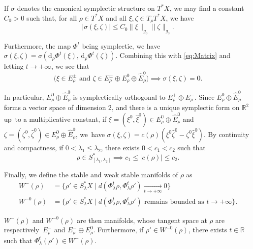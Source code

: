 \documentclass[10pt]{amsart}
\let\sep\mid
\newcommand{\sd}{\mathrm{d}}
\newcommand{\rd}{\,\mathrm{d}}
\theoremstyle{plain}
\theoremstyle{definition}
\newcommand{\R}{\mathbb{R}}
\begin{document}
If $\sigma$ denotes the canonical symplectic structure on $T^*X$, we may find a constant $C_0>0$ such that, for all $\rho\in T^*X$ and all $\xi, \zeta \in T_\rho T^*X$, we have
\begin{equation}\label{eq:CestRelouDeReprendreLePapier}
|\sigma(\xi, \zeta)| \leq C_0 \|\xi\|_{g_0} \|\zeta\|_{g_0}.
\end{equation}

Furthermore, the map $\Phi^t$ being symplectic, we have $\sigma(\xi, \zeta) = \sigma(\sd _\rho \Phi^t(\xi), \rd _\rho \Phi^t(\zeta))$. Combining this with \eqref{eq:Matrix} and letting $t\to \pm \infty$, we see that
\begin{equation}\label{eq:CestRelouDeReprendreLePapier2}
\bigl(\xi \in E_\rho^\pm \text{ and } \zeta \in E_\rho^\pm \oplus E_\rho^0 \oplus \hat{E}_\rho^0 \bigr) \implies \sigma(\xi, \zeta)=0.
\end{equation}

In particular, $E_\rho^0 \oplus \hat{E}_\rho^0$ is symplectically orthogonal to $E_\rho^+ \oplus E_\rho^-$. Since $E_\rho^0 \oplus \hat{E}_\rho^0$ forms a vector space of dimension 2, and there is a unique symplectic form on $\R^2$ up~to a multiplicative constant, if $\xi = (\xi^0, \hat{\xi}^0) \in E_\rho^0 \oplus \hat{E}_\rho^0$ and $\zeta = (\zeta^0, \hat{\zeta}^0) \in E_\rho^0 \oplus \hat{E}_\rho^0$, we~have $\sigma(\xi, \zeta) = c(\rho)(\xi^0 \hat{\zeta}^0 - \zeta^0 \hat{\xi}^0)$. By continuity and compactness, if $0<\lambda_1 \leq \lambda_2$, there exists $0< c_1<c_2$ such that
\begin{equation}\label{eq:CestRelouDeReprendreLePapier3}
\rho \in S^*_{[\lambda_1, \lambda_2]} \implies c_1 \leq |c(\rho)| \leq c_2.
\end{equation}

Finally, we define the stable and weak stable manifolds of $\rho$ as
\begin{align*}
W^{-}(\rho) &= \{ \rho'\in S_\lambda^*X \sep d (\Phi_\lambda^t \rho, \Phi_\lambda^t \rho') \underset{t\to +\infty}{\to} 0\}\\
W^{-0}(\rho) &= \{ \rho'\in S_\lambda^*X \sep d (\Phi_\lambda^t \rho, \Phi_\lambda^t \rho') \text{ remains bounded as } t\rightarrow +\infty\}.
\end{align*}

$W^{-}(\rho)$ and $W^{-0}(\rho)$ are then manifolds, whose tangent space at $\rho$ are respectively~$E_\rho^-$ and $E_\rho^- \oplus E^0_\rho$. Furthermore, if $\rho'\in W^{-0}(\rho)$, there exists $t\in \R$ such that $\Phi^t_\lambda(\rho') \in W^-(\rho)$.
\end{document}
